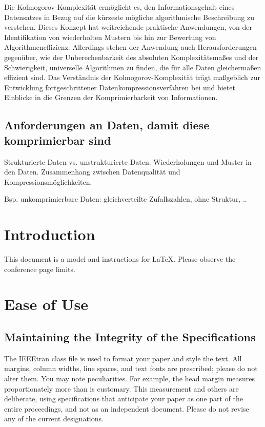 \documentclass[conference]{IEEEtran}
\begin{document}
Die Kolmogorov-Komplexität ermöglicht es, den Informationsgehalt eines Datensatzes in
Bezug auf die kürzeste mögliche algorithmische Beschreibung zu verstehen.
Dieses Konzept hat weitreichende praktische Anwendungen, von der Identifikation von
wiederholten Mustern bis hin zur Bewertung von Algorithmeneffizienz.
Allerdings stehen der Anwendung auch Herausforderungen gegenüber, wie der Unberechenbarkeit
des absoluten Komplexitätsmaßes und der Schwierigkeit, universelle Algorithmen zu finden,
die für alle Daten gleichermaßen effizient sind. Das Verständnis der Kolmogorov-Komplexität
trägt maßgeblich zur Entwicklung fortgeschrittener Datenkompressionsverfahren bei und bietet
Einblicke in die Grenzen der Komprimierbarkeit von Informationen.

\subsection{Anforderungen an Daten, damit diese komprimierbar sind}
Strukturierte Daten vs. unstrukturierte Daten.
Wiederholungen und Muster in den Daten.
Zusammenhang zwischen Datenqualität und Kompressionsmöglichkeiten.

Bsp. unkomprimierbare Daten: gleichverteilte Zufallszahlen, ohne Struktur, ..







\section{Introduction}
This document is a model and instructions for \LaTeX.
Please observe the conference page \cite{autor2023} limits.

\section{Ease of Use}

\subsection{Maintaining the Integrity of the Specifications}

The IEEEtran class file is used to format your paper and style the text. All margins,
column widths, line spaces, and text fonts are prescribed; please do not
alter them. You may note peculiarities. For example, the head margin
measures proportionately more than is customary. This measurement
and others are deliberate, using specifications that anticipate your paper
as one part of the entire proceedings, and not as an independent document.
Please do not revise any of the current designations.




\end{document}
